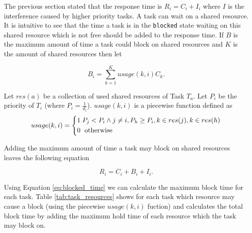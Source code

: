 \documentclass[10pt]{article}
\begin{document}
The previous section stated that the response time is $R_i = C_i + I_i$ where $I$ is the interference caused by higher priority tasks.
A task can wait on a shared resource. It is intuitive to see that the time a task is in the \texttt{blocked} state waiting on this shared resource which is not free should be added to the response time.
If $B$ is the maximum amount of time a task could block on shared resources and $K$ is the amount of shared resources then let

\begin{equation}
    B_i = \sum_{k = 1}^{K} usage(k,i) C_k.
    \label{eq:blocked_time}
\end{equation}

Let $res(a)$ be a collection of used shared resources of Task $T_a$. Let $P_i$ be the priority of $T_i$ (where $P_i = \frac{1}{d_i}$). $usage(k,i)$ is a piecewise function defined as 
\[
    usage(k,i) = 
    \begin{dcases}
        1 \;  P_j < P_i \wedge j \neq i, P_h \geq P_i, k \in res(j), k \in res(h) \\
        0 \;  \text{ otherwise }
    \end{dcases}
\]

Adding the maximum amount of time a task may block on shared resources leaves the following equation 

\begin{equation}
    R_i = C_i + B_i + I_i.
\end{equation}

Using Equation \ref{eq:blocked_time} we can calculate the maximum block time for each task.
Table \ref{tab:task_resources} shows for each task which resource may cause a block (using the piecewise $usage(k,i)$ fuction)
and calculates the total block time by adding the maximum hold time of each resource which the task may block on.
\end{document}
